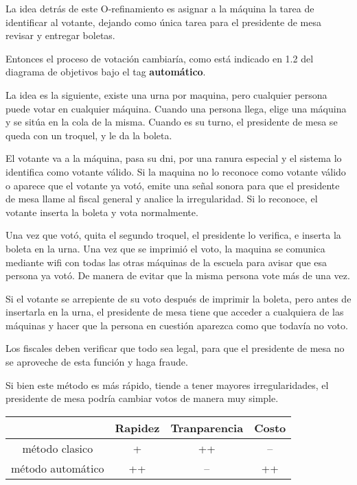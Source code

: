 La idea detrás de este O-refinamiento es asignar a la máquina la tarea de identificar al votante, dejando como única tarea para el presidente de mesa revisar y entregar boletas.

Entonces el proceso de votación cambiar\'ia, como está indicado en 1.2 del diagrama de objetivos bajo el tag \textbf{automático}.

La idea es la siguiente, existe una urna por maquina, pero cualquier persona puede votar en cualquier m\'aquina. Cuando una persona llega, elige una m\'aquina y se sitúa en la cola de la misma. Cuando es su turno, el presidente de mesa se queda con un troquel, y le da la boleta.

El votante va a la m\'aquina, pasa su dni, por una ranura especial y el sistema lo identifica como votante válido. Si la maquina no lo reconoce como votante válido o aparece que el votante ya votó, emite una señal sonora para que el presidente de mesa llame al fiscal general y analice la irregularidad. Si lo reconoce, el votante inserta la boleta y vota normalmente.

Una vez que votó, quita el segundo troquel, el presidente lo verifica, e inserta la boleta en la urna. Una vez que se imprimió el voto, la maquina se comunica mediante wifi con todas las otras máquinas de la escuela para avisar que esa persona ya votó. De manera de evitar que la misma persona vote más de una vez.

Si el votante se arrepiente de su voto después de imprimir la boleta, pero antes de insertarla en la urna, el presidente de mesa tiene que acceder a cualquiera de las máquinas y hacer que la persona en cuestión aparezca como que todavía no voto.

Los fiscales deben verificar que todo sea legal, para que el presidente de mesa no se aproveche de esta función y haga fraude.

Si bien este método es más r\'apido, tiende a tener mayores irregularidades, el presidente de mesa podría cambiar votos de manera muy simple. 

\begin{table}[H]
\centering
 \begin{tabular}{|c | c | c | c|} 
 \hline
 & Rapidez & Tranparencia & Costo \\
 \hline
 método clasico & + & ++  & -- \\
 \hline
 método automático & ++ & -- & ++ \\
 \hline
 
 \end{tabular}
\end{table}


